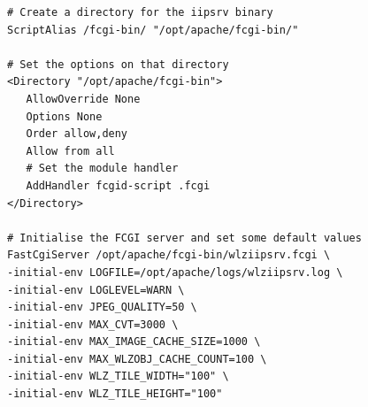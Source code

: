 \documentclass[11pt]{article}
\begin{document}
\begin{verbatim}
# Create a directory for the iipsrv binary
ScriptAlias /fcgi-bin/ "/opt/apache/fcgi-bin/"

# Set the options on that directory
<Directory "/opt/apache/fcgi-bin">
   AllowOverride None
   Options None
   Order allow,deny
   Allow from all
   # Set the module handler
   AddHandler fcgid-script .fcgi
</Directory>

# Initialise the FCGI server and set some default values
FastCgiServer /opt/apache/fcgi-bin/wlziipsrv.fcgi \
-initial-env LOGFILE=/opt/apache/logs/wlziipsrv.log \
-initial-env LOGLEVEL=WARN \
-initial-env JPEG_QUALITY=50 \
-initial-env MAX_CVT=3000 \
-initial-env MAX_IMAGE_CACHE_SIZE=1000 \
-initial-env MAX_WLZOBJ_CACHE_COUNT=100 \
-initial-env WLZ_TILE_WIDTH="100" \
-initial-env WLZ_TILE_HEIGHT="100"
\end{verbatim}



\end{document}
